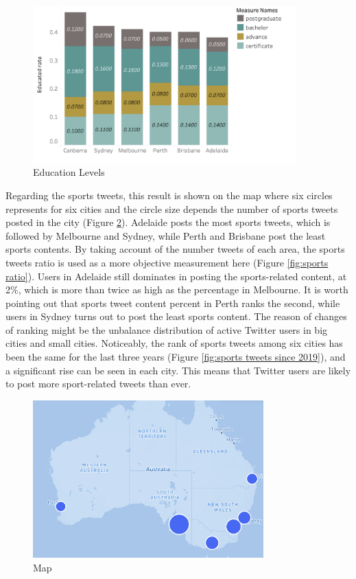 \begin{figure}[H]
\centerline{\includegraphics[width=4in]{Figures/education.png}}
\caption{Education Levels\label{education}}
\end{figure}

Regarding the sports tweets, this result is shown on the map where six circles represents for six cities and the circle size depends the number of sports tweets posted in the city (Figure \ref{map}). Adelaide posts the most sports tweets, which is followed by Melbourne and Sydney, while Perth and Brisbane post the least sports contents. By taking account of the number tweets of each area, the sports tweets ratio is used as a more objective measurement here (Figure \ref{fig:sports ratio}). Users in Adelaide still dominates in posting the sports-related content, at 2\%, which is more than twice as high as the percentage in Melbourne. It is worth pointing out that sports tweet content percent in Perth ranks the second, while users in Sydney turns out to post the least sports content. The reason of changes of ranking might be the unbalance distribution of active Twitter users in big cities and small cities. Noticeably, the rank of sports tweets among six cities has been the same for the last three years (Figure \ref{fig:sports tweets since 2019}), and a significant rise can be seen in each city. This means that Twitter users are likely to post more sport-related tweets than ever.

\begin{figure}[H]
\centerline{\includegraphics[width=3.5in]{Figures/Screen Shot 2021-05-25 at 8.47.44 pm.png}}
\caption{Map\label{map}}
\end{figure}

